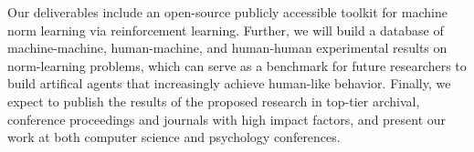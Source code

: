 Our deliverables include an open-source publicly accessible toolkit for machine norm learning via reinforcement learning. Further, we will build a database of machine-machine, human-machine, and human-human experimental results on norm-learning problems, which can serve as a benchmark for future researchers to build artifical agents that increasingly achieve human-like behavior. 
%
Finally, we expect to publish the results of the proposed research in
top-tier archival, conference proceedings and journals with high
impact factors, and present our work at both computer science and
psychology conferences.





